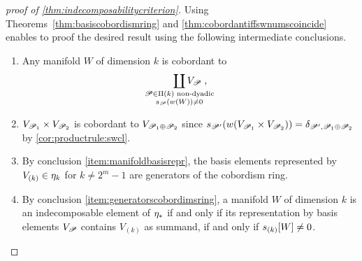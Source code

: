 \begin{proof}[proof of \autoref{thm:indecomposabilitycriterion}]
  Using Theorems~\autoref{thm:basiscobordismring} and
  \autoref{thm:cobordantiffswnumscoincide} enables to proof the
  desired result using the following intermediate conclusions.
  \begin{enumerate}
  \item Any manifold $W$ of dimension $k$ is
    cobordant to
    \begin{gather*}
      \coprod_{\mathclap{\substack{
            \Part\in\PartitionsOf k \text{ non-dyadic}\\
            \s{\Part}(\W{W})\neq 0
          }}} V_\Part
      \;,
    \end{gather*}
  \item\label{item:manifoldbasisrepr}
    $V_{\mathscr{P}_1}\times V_{\mathscr{P}_2}$ is cobordant to
    $V_{\mathscr{P}_1\oplus\mathscr{P}_2}$ since
    $s_{\mathscr{P}'}({w}(V_{\mathscr{P}_1}\times V_{\mathscr{P}_2}))
    = \delta_{\mathscr{P}', \mathscr{P}_1\oplus\mathscr{P}_2}$
    by \ref{cor:productrule:swcl}.
  \item\label{item:generatorscobordimsring}
    By conclusion \ref{item:manifoldbasisrepr},
    the basis elements represented by $V_{(k)}\in\eta_k$ for
    $k\neq 2^m-1$ are generators of the cobordism ring.
  \item By conclusion \ref{item:generatorscobordimsring}, a manifold
    $W$ of dimension $k$ is an indecomposable element of $\eta_*$ if and
    only if its representation by basis elements $V_{\mathscr{P}}$ contains
    $V_{(k)}$ as summand,
    \idest if and only if $s_{(k)}[W]\neq 0$.
    \qedhere
  \end{enumerate}
\end{proof}



